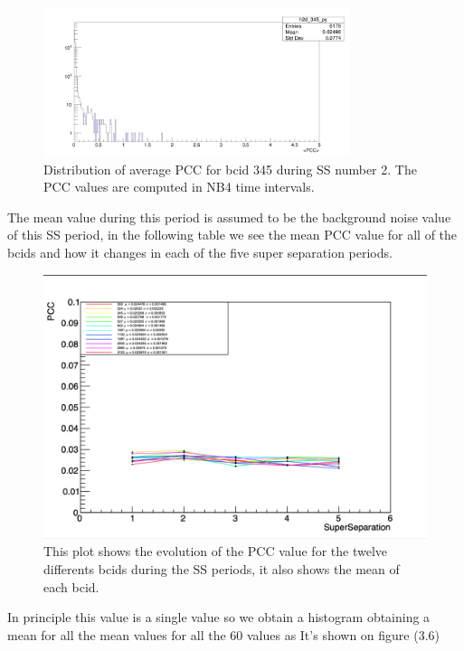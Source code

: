 \begin{figure}[H]
    \centering
    \includegraphics[height=0.4\textheight, width=0.8\textwidth]{sshist.png}
    \caption{Distribution of average PCC for bcid 345 during SS number 2. The PCC values are computed in NB4 time intervals.}
    \label{fig:SShist}
\end{figure}


The mean value during this period is assumed to be the background noise value of this SS period, in the following table we see the mean PCC value for all of the bcids and how it changes in each of the five super separation periods.

\begin{figure}[H]
    \centering
    \includegraphics[width=1\textwidth]{SSmean.png}
    \caption{This plot shows the evolution of the PCC value for the twelve differents bcids during the SS periods, it also shows the mean of each bcid.}
    \label{fig:SSmean}
\end{figure}

In principle this value is a single value so we obtain a histogram obtaining a mean for all the mean values for all the 60 values as It's shown on figure (3.6)


